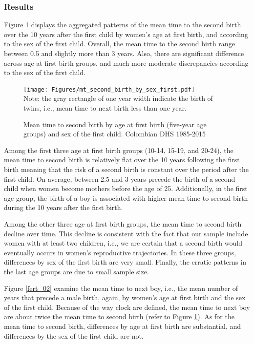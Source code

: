 \documentclass{article}
\begin{document}
\subsubsection{Results}
Figure \ref{fert_01} displays the aggregated patterns of the mean time to the second birth over the 10 years after the first child by women's age at first birth, and according to the sex of the first child. Overall, the mean time to the second birth range between 0.5 and slightly more than 3 years. Also, there are significant difference across age at first birth groups, and much more moderate discrepancies according to the sex of the first child.

\begin{figure}[H]
\centering
\caption{Mean time to second birth by age at first birth (five-year age groups) and sex of the first child. Colombian DHS 1985-2015}
    \texttt{[image: Figures/mt\_second\_birth\_by\_sex\_first.pdf]}\\
    \label{fert_01}
    Note: the gray rectangle of one year width indicate the birth of twins, i.e., mean time to next birth less than one year.
\end{figure}

Among the first three age at first birth groups (10-14, 15-19, and 20-24), the mean time to second birth is relatively flat over the 10 years following the first birth meaning that the risk of a second birth is constant over the period after the first child. On average, between 2.5 and 3 years precede the birth of a second child when women become mothers before the age of 25. Additionally, in the first age group, the birth of a boy is associated with higher mean time to second birth during the 10 years after the first birth.

Among the other three age at first birth groups, the mean time to second birth decline over time. This decline is consistent with the fact that our sample include women with at least two children, i.e., we are certain that a second birth would eventually occurs in women's reproductive trajectories. In these three groups, differences by sex of the first birth are very small. Finally, the erratic patterns in the last age groups are due to small sample size.

Figure \ref{fert_02} examine the mean time to next boy, i.e., the mean number of years that precede a male birth, again, by women's age at first birth and the sex of the first child. Because of the way clock are defined, the mean time to next boy are about twice the mean time to second birth (refer to Figure \ref{fert_01}). As for the mean time to second birth, differences by age at first birth are substantial, and differences by the sex of the first child are not.
\end{document}
